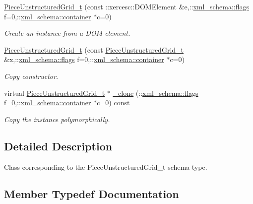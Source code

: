 \begin{DoxyCompactItemize}
\hyperlink{classPieceUnstructuredGrid__t_a56c6d065b161aa4f28789044d082c622}{Piece\+Unstructured\+Grid\+\_\+t} (const \+::xercesc\+::\+D\+O\+M\+Element \&e,\+::\hyperlink{namespacexml__schema_a8d981c127a1f5106d04ad5853e707361}{xml\+\_\+schema\+::flags} f=0,\+::\hyperlink{namespacexml__schema_a395f5179c5fc4643909d66e9ff28d8ca}{xml\+\_\+schema\+::container} $\ast$c=0)
\begin{DoxyCompactList}\small\item\em Create an instance from a D\+O\+M element. \end{DoxyCompactList}\item 
\hyperlink{classPieceUnstructuredGrid__t_a6a1c61bdda2b5458715e902eae2420f9}{Piece\+Unstructured\+Grid\+\_\+t} (const \hyperlink{classPieceUnstructuredGrid__t}{Piece\+Unstructured\+Grid\+\_\+t} \&x,\+::\hyperlink{namespacexml__schema_a8d981c127a1f5106d04ad5853e707361}{xml\+\_\+schema\+::flags} f=0,\+::\hyperlink{namespacexml__schema_a395f5179c5fc4643909d66e9ff28d8ca}{xml\+\_\+schema\+::container} $\ast$c=0)
\begin{DoxyCompactList}\small\item\em Copy constructor. \end{DoxyCompactList}\item 
virtual \hyperlink{classPieceUnstructuredGrid__t}{Piece\+Unstructured\+Grid\+\_\+t} $\ast$ \hyperlink{classPieceUnstructuredGrid__t_a48f6dcab2714e3f907993e1c99bcc8b2}{\+\_\+clone} (\+::\hyperlink{namespacexml__schema_a8d981c127a1f5106d04ad5853e707361}{xml\+\_\+schema\+::flags} f=0,\+::\hyperlink{namespacexml__schema_a395f5179c5fc4643909d66e9ff28d8ca}{xml\+\_\+schema\+::container} $\ast$c=0) const 
\begin{DoxyCompactList}\small\item\em Copy the instance polymorphically. \end{DoxyCompactList}\end{DoxyCompactItemize}


\subsection{Detailed Description}
Class corresponding to the Piece\+Unstructured\+Grid\+\_\+t schema type. 

\subsection{Member Typedef Documentation}
\hypertarget{classPieceUnstructuredGrid__t_a0e04d369c16993da7e5e2a7152c2e518}{}
